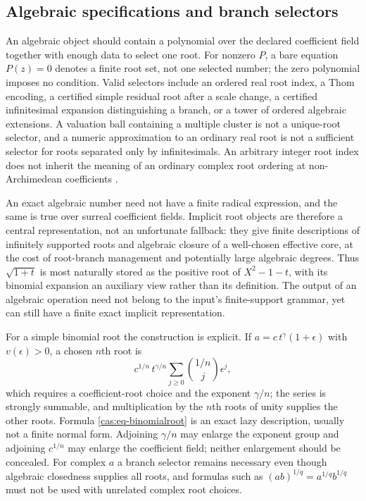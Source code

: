 \documentclass[11pt,letterpaper]{article}
\numberwithin{equation}{section}
\theoremstyle{definition}
\theoremstyle{remark}
\begin{document}
\subsection{Algebraic specifications and branch selectors}
\label{cas:sub-algebraic}
An algebraic object should contain a polynomial over the declared coefficient
field together with enough data to select one root. For nonzero $P$, a bare
equation $P(z)=0$ denotes a finite root set, not one selected number; the zero
polynomial imposes no condition. Valid selectors include an
ordered real root index, a Thom encoding, a certified simple residual root after
a scale change, a certified infinitesimal expansion distinguishing a branch, or
a tower of ordered algebraic extensions. A valuation ball containing a multiple
cluster is not a unique-root selector, and a numeric approximation to an
ordinary real root is not a sufficient selector for roots separated only by
infinitesimals. An arbitrary integer root index does not inherit the meaning of
an ordinary complex root ordering at non-Archimedean coefficients
\cite{cas:WLRoot}.

An exact algebraic number need not have a finite radical expression, and the
same is true over surreal coefficient fields. Implicit root objects are
therefore a central representation, not an unfortunate fallback: they give
finite descriptions of infinitely supported roots and algebraic closure of a
well-chosen effective core, at the cost of root-branch management and
potentially large algebraic degrees. Thus $\sqrt{1+t}$ is most naturally stored
as the positive root of $X^2-1-t$, with its binomial expansion an auxiliary view
rather than its definition. The output of an algebraic operation need not belong
to the input's finite-support grammar, yet can still have a finite exact
implicit representation.

For a simple binomial root the construction is explicit. If $a=c\,t^\gamma(1+\epsilon)$
with $v(\epsilon)>0$, a chosen $n$th root is
\begin{equation}\label{cas:eq-binomialroot}
 c^{1/n}\,t^{\gamma/n}\sum_{j\ge0}\binom{1/n}{j}\epsilon^j ,
\end{equation}
which requires a coefficient-root choice and the exponent $\gamma/n$; the series
is strongly summable, and multiplication by the $n$th roots of unity supplies
the other roots. Formula \eqref{cas:eq-binomialroot} is an exact lazy
description, usually not a finite normal form. Adjoining $\gamma/n$ may enlarge
the exponent group and adjoining $c^{1/n}$ may enlarge the coefficient field;
neither enlargement should be concealed. For complex $a$ a branch selector
remains necessary even though algebraic closedness supplies all roots, and
formulas such as $(ab)^{1/q}=a^{1/q}b^{1/q}$ must not be used with unrelated
complex root choices.
\end{document}
